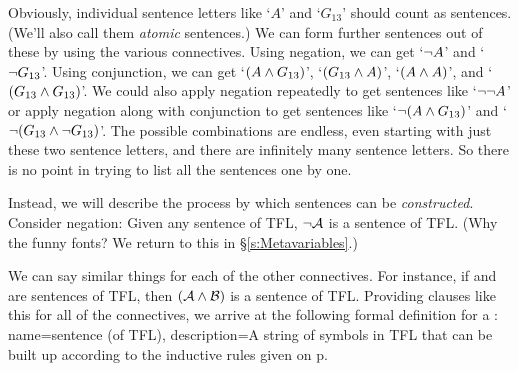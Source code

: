 Obviously, individual sentence letters like `$A$' and `$G_{13}$' should count as sentences. (We'll also call them \emph{atomic} sentences.) We can form further sentences out of these by using the various connectives. Using negation, we can get `$\neg A$' and `$\neg G_{13}$'. Using conjunction, we can get `$(A \wedge G_{13})$', `$(G_{13} \wedge A)$', `$(A \wedge A)$', and `$(G_{13} \wedge G_{13})$'. We could also apply negation repeatedly to get sentences like `$\neg \neg A$' or apply negation along with conjunction to get sentences like `$\neg(A \wedge G_{13})$' and `$\neg(G_{13} \wedge \neg G_{13})$'. The possible combinations are endless, even starting with just these two sentence letters, and there are infinitely many sentence letters. So there is no point in trying to list all the sentences one by one.

Instead, we will describe the process by which sentences can be \emph{constructed}. Consider negation: Given any sentence  of TFL, $\neg\mathcal{A}$ is a sentence of TFL. (Why the funny fonts? We return to this in \S\ref{s:Metavariables}.)

We can say similar things for each of the other connectives. For instance, if  and  are sentences of TFL, then $(\mathcal{A}\wedge\mathcal{B})$ is a sentence of TFL. Providing clauses like this for all of the connectives, we arrive at the following formal definition for a :
{
name=sentence (of TFL),
description={A string of symbols in TFL that can be built up according to the inductive rules given on p.~\pageref{TFLsentences}}
}

